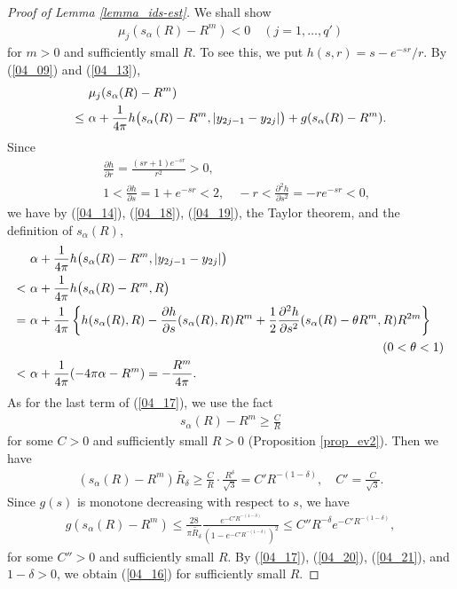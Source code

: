 \documentclass[12pt,a4paper]{article}
\begin{document}
\begin{proof}[Proof of Lemma \ref{lemma_ids-est}]
We shall show
\begin{align}
\label{04_16}
 \mu_j(s_{\alpha}(R)-R^m)<0\quad (j=1,\ldots,q')
\end{align}
for $m>0$ and sufficiently small $R$.
To see this, we put $h(s,r)=s-e^{-sr}/r$.
By (\ref{04_09}) and (\ref{04_13}),
\begin{align}
&\  \mu_j(s_{\alpha}(R)-R^m)\notag\\
\leq &\ 
\alpha + \frac{1}{4\pi}h\bigl(s_{\alpha}(R)-R^m, |y_{2j-1}-y_{2j}|\bigr)
+g(s_{\alpha}(R)-R^m).
\label{04_17}
\end{align}
Since
\begin{align}
&\  \frac{\partial h}{\partial r}=\frac{(sr+1)e^{-sr}}{r^2}>0,
\label{04_18}
\\
&\ 1< \frac{\partial h}{\partial s}=1+e^{-sr}<2,\quad
-r< \frac{\partial^2 h}{\partial s^2}=-r e^{-sr}<0,
\label{04_19}
\end{align}
we have by (\ref{04_14}),
(\ref{04_18}), (\ref{04_19}),
the Taylor theorem,
and the definition of $s_\alpha(R)$,
\begin{align}
&\ 
\alpha+ \frac{1}{4\pi}h\bigl(s_{\alpha}(R)-R^m, |y_{2j-1}-y_{2j}|\bigr)\notag\\
<&\ 
\alpha+ \frac{1}{4\pi}h\bigl(s_{\alpha}(R)-R^m, R\bigr)\notag\\
=&\ 
\alpha
+
\frac{1}{4\pi}
\left\{h(s_\alpha(R),R)
-\frac{\partial h}{\partial s}
(s_\alpha(R),R)R^m
+
\frac{1}{2}\frac{\partial^2 h}{\partial s^2}(s_\alpha(R)-\theta R^m,R)R^{2m}
\right\}\notag\\
&\ 
\hspace{10cm} (0<\theta<1)\notag\\
<&\ 
\alpha+\frac{1}{4\pi}(-4\pi \alpha -R^m)=-\frac{R^m}{4\pi}.
\label{04_20}
\end{align}
As for the last term of (\ref{04_17}),
we use the fact
\begin{align*}
 s_\alpha(R)-R^m
\geq \frac{C}{R}
\end{align*}
for some $C>0$ and sufficiently small $R>0$
(Proposition \ref{prop_ev2}).
Then we have
\begin{align*}
 ( s_\alpha(R)-R^m)\widetilde{R_\delta} 
\geq \frac{C}{R}\cdot \frac{R^\delta}{\sqrt{3}}=C' R^{-(1-\delta)},
\quad
C'=\frac{C}{\sqrt{3}}.
\end{align*}
Since $g(s)$ is monotone decreasing with respect to $s$,
we have
\begin{align}
 g(s_\alpha(R)-R^m)
\leq 
\frac{28}{\pi \widetilde{R_\delta}}
\frac{e^{-C'R^{-(1-\delta)}}}{(1-e^{-C'R^{-(1-\delta)}})^2}
\leq C'' R^{-\delta}e^{-C'R^{-(1-\delta)}},
\label{04_21}
\end{align}
for some $C''>0$ and sufficiently small $R$.
By (\ref{04_17}), (\ref{04_20}), (\ref{04_21}), and $1-\delta>0$,
we obtain (\ref{04_16}) for sufficiently small $R$.


\end{proof}
\end{document}
